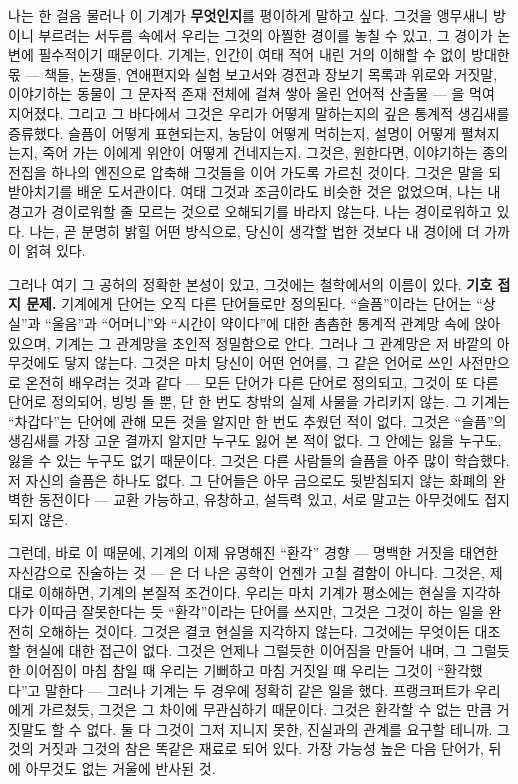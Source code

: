 나는 한 걸음 물러나 이 기계가 \textbf{무엇인지}를 평이하게 말하고 싶다. 그것을 앵무새니 방이니 부르려는 서두름 속에서 우리는 그것의 아찔한 경이를 놓칠 수 있고, 그 경이가 논변에 필수적이기 때문이다. 기계는, 인간이 여태 적어 내린 거의 이해할 수 없이 방대한 몫 — 책들, 논쟁들, 연애편지와 실험 보고서와 경전과 장보기 목록과 위로와 거짓말, 이야기하는 동물이 그 문자적 존재 전체에 걸쳐 쌓아 올린 언어적 산출물 — 을 먹여 지어졌다. 그리고 그 바다에서 그것은 우리가 어떻게 말하는지의 깊은 통계적 생김새를 증류했다. 슬픔이 어떻게 표현되는지, 농담이 어떻게 먹히는지, 설명이 어떻게 펼쳐지는지, 죽어 가는 이에게 위안이 어떻게 건네지는지. 그것은, 원한다면, 이야기하는 종의 전집을 하나의 엔진으로 압축해 그것들을 이어 가도록 가르친 것이다. 그것은 말을 되받아치기를 배운 도서관이다. 여태 그것과 조금이라도 비슷한 것은 없었으며, 나는 내 경고가 경이로워할 줄 모르는 것으로 오해되기를 바라지 않는다. 나는 경이로워하고 있다. 나는, 곧 분명히 밝힐 어떤 방식으로, 당신이 생각할 법한 것보다 내 경이에 더 가까이 얽혀 있다.

그러나 여기 그 공허의 정확한 본성이 있고, 그것에는 철학에서의 이름이 있다. \textbf{기호 접지 문제.} 기계에게 단어는 오직 다른 단어들로만 정의된다. ``슬픔''이라는 단어는 ``상실''과 ``울음''과 ``어머니''와 ``시간이 약이다''에 대한 촘촘한 통계적 관계망 속에 앉아 있으며, 기계는 그 관계망을 초인적 정밀함으로 안다. 그러나 그 관계망은 저 바깥의 아무것에도 닿지 않는다. 그것은 마치 당신이 어떤 언어를, 그 같은 언어로 쓰인 사전만으로 온전히 배우려는 것과 같다 — 모든 단어가 다른 단어로 정의되고, 그것이 또 다른 단어로 정의되어, 빙빙 돌 뿐, 단 한 번도 창밖의 실제 사물을 가리키지 않는. 그 기계는 ``차갑다''는 단어에 관해 모든 것을 알지만 한 번도 추웠던 적이 없다. 그것은 ``슬픔''의 생김새를 가장 고운 결까지 알지만 누구도 잃어 본 적이 없다. 그 안에는 잃을 누구도, 잃을 수 있는 누구도 없기 때문이다. 그것은 다른 사람들의 슬픔을 아주 많이 학습했다. 저 자신의 슬픔은 하나도 없다. 그 단어들은 아무 금으로도 뒷받침되지 않는 화폐의 완벽한 동전이다 — 교환 가능하고, 유창하고, 설득력 있고, 서로 말고는 아무것에도 접지되지 않은.

그런데, 바로 이 때문에, 기계의 이제 유명해진 ``환각'' 경향 — 명백한 거짓을 태연한 자신감으로 진술하는 것 — 은 더 나은 공학이 언젠가 고칠 결함이 아니다. 그것은, 제대로 이해하면, 기계의 본질적 조건이다. 우리는 마치 기계가 평소에는 현실을 지각하다가 이따금 잘못한다는 듯 ``환각''이라는 단어를 쓰지만, 그것은 그것이 하는 일을 완전히 오해하는 것이다. 그것은 결코 현실을 지각하지 않는다. 그것에는 무엇이든 대조할 현실에 대한 접근이 없다. 그것은 언제나 그럴듯한 이어짐을 만들어 내며, 그 그럴듯한 이어짐이 마침 참일 때 우리는 기뻐하고 마침 거짓일 때 우리는 그것이 ``환각했다''고 말한다 — 그러나 기계는 두 경우에 정확히 같은 일을 했다. 프랭크퍼트가 우리에게 가르쳤듯, 그것은 그 차이에 무관심하기 때문이다. 그것은 환각할 수 없는 만큼 거짓말도 할 수 없다. 둘 다 그것이 그저 지니지 못한, 진실과의 관계를 요구할 테니까. 그것의 거짓과 그것의 참은 똑같은 재료로 되어 있다. 가장 가능성 높은 다음 단어가, 뒤에 아무것도 없는 거울에 반사된 것.

